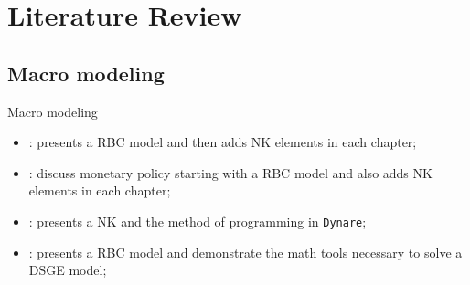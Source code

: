 \documentclass[../quali_slides.tex]{subfiles}
\begin{document}
\section{Literature Review}


\subsection{Macro modeling}

\begin{frame}[fragile]{Macro modeling}
	
	\begin{itemize}
		
		\item \textcite{costa_junior_understanding_2016}: presents a RBC model and then adds NK elements in each chapter;
		
		\item \textcite{gali_monetary_2015}: discuss monetary policy starting with a RBC model and also adds NK elements in each chapter;
		
		\item \textcite{bergholt_basic_2012}: presents a NK and the method of programming in \texttt{Dynare};
		
		\item \textcite{solis-garcia_ucb_2022}: presents a RBC model and demonstrate the math tools necessary to solve a DSGE model;
				
	\end{itemize}
	
\end{frame}

\end{document}
